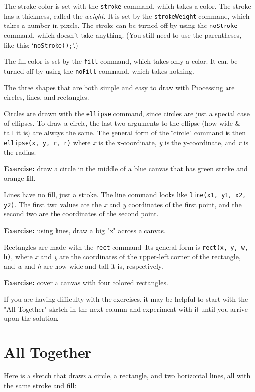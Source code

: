 \documentclass[
]{leaflet}
\begin{document}
The stroke color is set with the \texttt{stroke} command, which takes a color.
The stroke has a thickness, called the \textit{weight}.
It is set by the \texttt{strokeWeight} command, which takes a number in pixels.
The stroke can be turned off by using the \texttt{noStroke} command, which doesn't take anything.
(You still need to use the parentheses, like this: `\texttt{noStroke();}'.)

The fill color is set by the \texttt{fill} command, which takes only a color.
It can be turned off by using the \texttt{noFill} command, which takes nothing.

The three shapes that are both simple and easy to draw with Processing are circles, lines, and rectangles.

Circles are drawn with the \texttt{ellipse} command, since circles are just a special case of ellipses.
To draw a circle, the last two arguments to the ellipse (how wide \& tall it is) are always the same.
The general form of the "circle" command is then \texttt{ellipse(x, y, r, r)} where \textit{x} is the x-coordinate, \textit{y} is the y-coordinate, and \textit{r} is the radius.

\textbf{Exercise:} draw a circle in the middle of a blue canvas that has green stroke and orange fill.

Lines have no fill, just a stroke.
The line command looks like \texttt{line(x1, y1, x2, y2)}.
The first two values are the \textit{x} and \textit{y} coordinates of the first point, and the second two are the coordinates of the second point.

\textbf{Exercise:} using lines, draw a big "x" across a canvas.

Rectangles are made with the \texttt{rect} command.
Its general form is \texttt{rect(x, y, w, h)}, where \textit{x} and \textit{y} are the coordinates of the upper-left corner of the rectangle, and \textit{w} and \textit{h} are how wide and tall it is, respectively.

\textbf{Exercise:} cover a canvas with four colored rectangles.

If you are having difficulty with the exercises, it may be helpful to start with the "All Together" sketch in the next column and experiment with it until you arrive upon the solution.

\section{All Together}

Here is a sketch that draws a circle, a rectangle, and two horizontal lines, all with the same stroke and fill:
\end{document}
